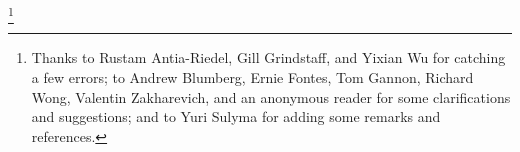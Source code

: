 
\author{Arun Debray}
\date{\today}
\thanks{Thanks to Rustam Antia-Riedel, Gill Grindstaff, and Yixian Wu for catching a few errors; to Andrew
Blumberg, Ernie Fontes, Tom Gannon, Richard Wong, Valentin Zakharevich, and an anonymous reader for some
clarifications and suggestions; and to Yuri Sulyma for adding some remarks and references.}

\usepackage[charter]{mathdesign}
\usepackage[T1]{fontenc}
\usepackage{tikz}
\usetikzlibrary{shapes.geometric}


\renewcommand{\term}[1]{{\bfseries #1}}
\newcommand{\sSet}{\cat{sSet}}
\DeclareMathOperator{\Map}{Map}
\DeclareMathOperator{\rank}{rank\,}
\DeclareMathOperator{\Un}{Un}
\newcommand{\KU}{\mathit{KU}}
\newcommand{\isom}{\stackrel\cong\to}
\DeclareMathOperator{\Ind}{Ind}
\DeclareMathOperator{\CoInd}{CoInd}
\newcommand{\Spc}{\cat{Sp}}
\newcommand{\overwedge}{\mathbin{\overline\wedge}}
\DeclareMathOperator{\Ev}{Ev}
\newcommand{\sW}{\mathscr W}
\DeclareMathOperator{\Ho}{Ho}
\newcommand{\simeqto}{\stackrel\simeq\to}
\newcommand{\congto}{\stackrel\cong\to}
\newcommand{\wI}{\widetilde I}

\newcommand{\LD}{\mathbf L}
\newcommand{\RD}{\mathbf R}

\DeclareMathOperator{\Lan}{Lan}
\DeclareMathOperator{\Ran}{Ran}

\newcommand{\matr}[4]{
  \begin{bmatrix} #1 & #2 \\ #3 & #4 \end{bmatrix}
}

\newcommand{\morph}{\mathop{\longrightarrow}\limits}
\newcommand{\twomorph}{\mathop{\Longrightarrow}\limits}


\newcommand*\lon{%
        \nobreak
        \mskip6mu plus1mu
        \mathpunct{}%
        \nonscript
        \mkern-\thinmuskip
        {:}%
        \mskip2mu
        \relax
}

